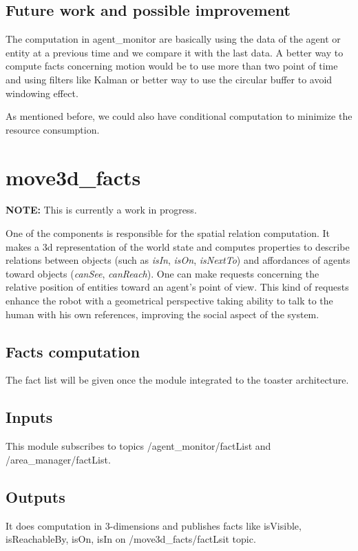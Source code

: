 \documentclass[a4paper]{article}
\begin{document}
\subsection{Future work and possible improvement}
The computation in agent\_monitor are basically using the data of the agent or entity at a previous time and we compare it with the last data. A better way to compute facts concerning motion would be to use more than two point of time and using filters like Kalman or better way to use the circular buffer to avoid windowing effect.

As mentioned before, we could also have conditional computation to minimize the resource consumption.




\section{move3d\_facts}
\textbf{NOTE:} This is currently a work in progress.

One of the components is responsible for the spatial relation computation. It makes a 3d representation of the world state and computes properties to describe relations between objects (such as \textit{isIn}, \textit{isOn}, \textit{isNextTo}) and affordances of agents toward objects (\textit{canSee}, \textit{canReach}). One can make requests concerning the relative position of entities toward an agent's point of view. This kind of requests enhance the robot with a geometrical perspective taking ability to talk to the human with his own references, improving the social aspect of the system.


\subsection{Facts computation}

The fact list will be given once the module integrated to the toaster architecture.


\subsection{Inputs}
This module subscribes to topics /agent\_monitor/factList and /area\_manager/factList.
\subsection{Outputs}
It does computation in 3-dimensions and publishes facts like isVisible, isReachableBy, isOn, isIn on /move3d\_facts/factLsit topic.
\end{document}
